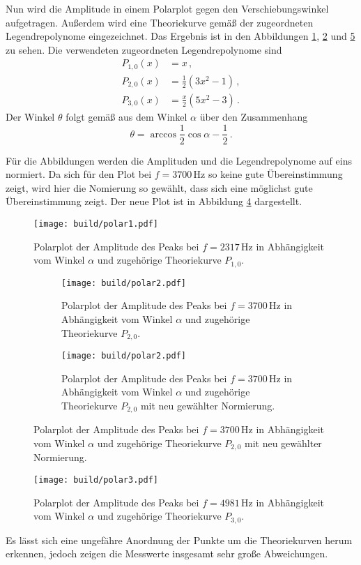 Nun wird die Amplitude in einem Polarplot gegen den Verschiebungswinkel aufgetragen.
Außerdem wird eine Theoriekurve gemäß der zugeordneten Legendrepolynome eingezeichnet.
Das Ergebnis ist in den Abbildungen \ref{fig:polar1}, \ref{fig:polar2} und
\ref{fig:polar3} zu sehen. Die verwendeten zugeordneten Legendrepolynome sind
\begin{align*}
	P_{1,0}(x)&=x \,,\\
	P_{2,0}(x)&=\frac{1}{2}(3x^2-1) \,,\\
	P_{3,0}(x)&=\frac{x}{2}(5x^2-3) \,.
\end{align*}
Der Winkel $\theta$ folgt gemäß \cite{Formel} aus dem Winkel $\alpha$ über den Zusammenhang
\begin{equation*}
	\theta=\arccos{\frac{1}{2}\cos{\alpha}-\frac{1}{2}} \,.
\end{equation*}

Für die Abbildungen werden die Amplituden und die Legendrepolynome auf eins normiert.
Da sich für den Plot bei $f=3700$\,Hz so keine gute Übereinstimmung zeigt, wird hier
die Nomierung so gewählt, dass sich eine möglichst gute Übereinstimmung zeigt.
Der neue Plot ist in Abbildung \ref{fig:polar2neu} dargestellt.

\begin{figure}
  \centering
  \texttt{[image: build/polar1.pdf]}
  \caption{Polarplot der Amplitude des Peaks bei $f=2317$\,Hz in Abhängigkeit vom
  Winkel $\alpha$ und zugehörige Theoriekurve $P_{1,0}$.}
  \label{fig:polar1}
\end{figure}

\begin{figure}[h!]
  \centering
  \begin{subfigure}{0.49\textwidth}
  	\centering
  	\texttt{[image: build/polar2.pdf]}
  	\caption{Polarplot der Amplitude des Peaks bei $f=3700$\,Hz in Abhängigkeit vom
  	Winkel $\alpha$ und zugehörige Theoriekurve $P_{2,0}$.}
  	\label{fig:polar2}
	\end{subfigure}
	\begin{subfigure}{0.49\textwidth}
  	\centering
  	\texttt{[image: build/polar2.pdf]}
  	\caption{Polarplot der Amplitude des Peaks bei $f=3700$\,Hz in Abhängigkeit vom
  	Winkel $\alpha$ und zugehörige Theoriekurve $P_{2,0}$ mit neu gewählter Normierung.}
  	\label{fig:polar2neu}
	\end{subfigure}
\end{figure}

\begin{figure}
  \centering
  \texttt{[image: build/polar3.pdf]}
  \caption{Polarplot der Amplitude des Peaks bei $f=4981$\,Hz in Abhängigkeit vom
  Winkel $\alpha$ und zugehörige Theoriekurve $P_{3,0}$.}
  \label{fig:polar3}
\end{figure}

Es lässt sich eine ungefähre Anordnung der Punkte um die Theoriekurven herum erkennen,
jedoch zeigen die Messwerte insgesamt sehr große Abweichungen.
